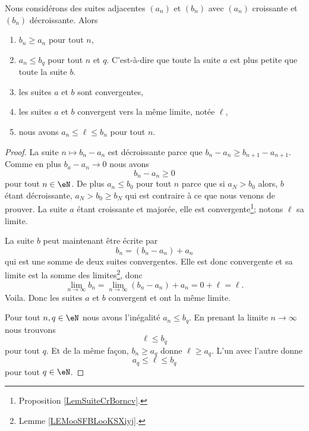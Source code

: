 \begin{theorem}      \label{THOooZJWLooAtGMxD}
    Nous considérons des suites adjacentes \( (a_n)\) et \( (b_n)\) avec \( (a_n)\) croissante et \( (b_n)\) décroissante. Alors
    \begin{enumerate}
        \item
            \( b_n\geq a_n\) pour tout \( n\),
        \item
            \( a_n\leq b_q\) pour tout \( n\) et \( q\). C'est-à-dire que toute la suite \( a\) est plus petite que toute la suite \( b\).
        \item
            les suites \( a\) et \( b\) sont convergentes,
        \item
            les suites \( a\) et \( b\) convergent vers la même limite, notée \( \ell\),
        \item
            nous avons \( a_n\leq \ell\leq b_n\) pour tout \( n\).
    \end{enumerate}
\end{theorem}

\begin{proof}
    La suite \( n\mapsto b_n-a_n\) est décroissante parce que \( b_n-a_n\geq b_{n+1}-a_{n+1}\). Comme en plus \( b_a-a_n\to 0\) nous avons
    \begin{equation}
        b_n-a_n\geq 0
    \end{equation}
    pour tout \( n\in \eN\). De plus \( a_n\leq b_0\) pour tout \( n\) parce que si \( a_N>b_0\) alors, \( b\) étant décroissante, \( a_N>b_0\geq b_N\) qui est contraire à ce que nous venons de prouver. La suite \( a\) étant croissante et majorée, elle est convergente\footnote{Proposition \ref{LemSuiteCrBorncv}.}; notons \( \ell\) sa limite.

    La suite \( b\) peut maintenant être écrite par
    \begin{equation}
        b_n=(b_n-a_n)+a_n
    \end{equation}
    qui est une somme de deux suites convergentes. Elle est donc convergente et sa limite est la somme des limites\footnote{Lemme \ref{LEMooSFBLooKSXiyj}.}, donc
    \begin{equation}
        \lim_{n\to \infty} b_n=\lim_{n\to \infty} (b_n-a_n)+a_n=0+\ell=\ell.
    \end{equation}
    Voila. Donc les suites \( a\) et \( b\) convergent et ont la même limite.

    Pour tout \( n,q\in \eN\) nous avons l'inégalité \( a_n\leq b_q\). En prenant la limite \( n\to \infty\) nous trouvons
    \begin{equation}
        \ell\leq b_q
    \end{equation}
    pour tout \( q\). Et de la même façon, \( b_n\geq a_q\) donne \( \ell\geq a_q\). L'un avec l'autre donne
    \begin{equation}
        a_q\leq \ell\leq b_q
    \end{equation}
    pour tout \( q\in \eN\).
\end{proof}

